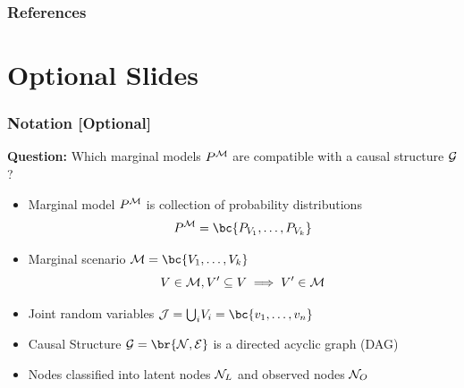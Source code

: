 \documentclass[
    hyperref={bookmarks=false},%
    xcolor={dvipsnames},
]{beamer}
\renewcommand{\term}[1]{\textcolor{Mahogany}{#1}}
\begin{document}
\begin{frame}[allowframebreaks]
    \frametitle{References}
    \printbibliography
\end{frame}

\section{Optional Slides}

\begin{frame}
    \frametitle{Notation [Optional]}
    \textbf{Question:} Which marginal models $\prob^{\mscenario}$ are \term{compatible} with a causal structure $\mathcal{G}$?\\
    \begin{itemize}
        \item \term{Marginal model} $\prob^{\mscenario}$ is collection of probability distributions
        \[ \prob^{\mscenario} = \bc{\prob[V_1], \ldots, \prob[V_k]} \]
        \item \term{Marginal scenario} $\mscenario = \bc{V_1, \ldots, V_k}$
        \[ V \in \mathcal{M}, V' \subseteq V  \implies V' \in \mathcal{M} \]
        \item \term{Joint random variables} $\jointvar = {\bigcup}_{i} V_i = \bc{v_1, \ldots, v_n}$
        \item \term{Causal Structure} $\graph = \br{\nodes, \edges}$ is a directed acyclic graph (DAG)
        \item Nodes classified into \term{latent nodes} $\mathcal{N}_{L}$ and \term{observed nodes} $\mathcal{N}_{O}$
    \end{itemize}
\end{frame}
\end{document}
